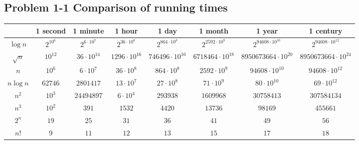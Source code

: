 \subsection*{Problem 1-1 Comparison of running times}

\newsavebox{\tablebox}
\begin{lrbox}{\tablebox}
	\begin{tabular}{c | c | c | c | c | c | c | c |}
		 & 1 second & 1 minute & 1 hour & 1 day & 1 month & 1 year & 1 century \\\hline
		$\log{n}$ & $2^{10^6}$ & $2^{6 \cdot 10^7}$ & $2^{36 \cdot 10^8}$ & $2^{864 \cdot 10^8}$ & $2^{2592 \cdot 10^9}$ & $2^{94608 \cdot 10^{10}}$ & $2^{94608 \cdot 10^{12}}$ \\\hline
		$\sqrt{n}$ & $10^{12}$ & $36 \cdot 10^{14}$ & $1296 \cdot 10^{16}$ & $746496 \cdot 10^{16}$ & $6718464 \cdot 10^{18}$ & $8950673664 \cdot 10^{20}$ & $8950673664 \cdot 10^{24}$ \\\hline
		$n$ & $10^6$ & $6 \cdot 10^7$ & $36 \cdot 10^8$ & $864 \cdot 10^8$ & $2592 \cdot 10^9$ & $94608 \cdot 10^{10}$ & $94608 \cdot 10^{12}$ \\\hline
		$n\log{n}$ & $62746$ & $2801417$ & $13 \cdot 10^7$ & $27 \cdot 10^8$ & $71 \cdot 10^9$ & $80 \cdot 10^{10}$ & $69 \cdot 10^{12}$ \\\hline
		$n^2$ & $10^3$ & $24494897$ & $6 \cdot 10^4$ & $293938$ & $1609968$ & $30758413$ & $307584134$ \\\hline
		$n^3$ & $10^2$ & $391$ & $1532$ & $4420$ & $13736$ & $98169$ & $455661$ \\\hline
		$2^n$ & $19$ & $25$ & $31$ & $36$ & $41$ & $49$ & $56$ \\\hline
		$n!$ & $9$ & $11$ & $12$ & $13$ & $15$ & $17$ & $18$ \\\hline
	\end{tabular}
\end{lrbox}

\begin{center}
\resizebox{1.2\textwidth}{!}{\usebox{\tablebox}}
\end{center}

